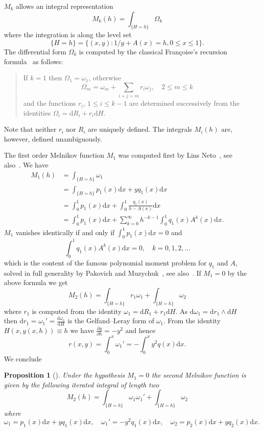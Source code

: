 \documentclass[11pt]{article}
\newtheorem{prop}[theo]{Proposition}
\theoremstyle{definition}
\numberwithin{equation}{section}
\numberwithin{figure}{section}
\numberwithin{table}{section}
\newcommand*{\dd}{\mathrm{d}}
\newcommand*{\dx}{\dd x}
\newcommand*{\dH}{\dd H}
\newcommand*{\dR}{\dd R}
\newcommand*{\dr}{\dd r}
\newcommand*{\domega}{\dd \omega}
\begin{document}
$M_k$ allows an integral representation
\[
M_k(h) = \int_{\{H=h\}} \Omega_k
\]
where the integration is along the level set
\[
\{H=h\} = \{(x,y) : 1/y + A(x)= h, 0\leq x \leq 1 \}.
\]
The differential form $\Omega_k$ is computed by the classical Françoise's recursion formula~\cite{fran96,ilie98a,rous98} as follows:
\begin{quotation}
If $k=1$ then $\Omega_1 = \omega_1$, otherwise
\begin{equation}
\Omega_m = \omega_m + \sum_{i+j=m} r_i \omega_j, \quad 2 \leq m \leq k
\end{equation}
and the functions $r_i$, $1\leq i \leq k-1$ are determined successively from the identities $\Omega_i = \dd R_i + r_i \dH$.
\end{quotation}
Note that neither $r_i$ nor $R_i$ are uniquely defined. The integrals $M_i(h)$ are, however, defined unambiguously.

The first order Melnikov function $M_1$ was computed first by Lins Neto~\cite[Section~3]{lins80}, see also~\cite{bfy00}. We have
\begin{align*}
M_1(h) &= \int_{\{H=h\}} \omega_1 \\ &= \int_{\{H=h\}} p_1(x) \dx + yq_1(x) \dx\\
& = \int_0^1 p_1(x) \dx + \int_0^1 \frac{q_1(x)}{h - A(x)} \dx \\
& = \int_0^1 p_1(x) \dx + \sum_{k=0}^\infty h^{-k-1} \int_0^1 q_1(x) A^k(x)\dx.
\end{align*}
$M_1$ vanishes identically if and only if $\int_0^1 p_1(x) \dx = 0$ and
\[
\int_0^1 q_1(x) A^k(x) \dx = 0, \quad k= 0,1,2, \dots
\]
which is the content of the famous polynomial moment problem for $q_1$ and $A$, solved in full generality by Pakovich and Muzychuk~\cite{pamu09}, see also~\cite{bfy98,bfy99,bfy00,chri00,yomd03}. If $M_1=0$ by the above formula we get
\[
M_2(h)= \int_{\{H=h\}} r_1 \omega_1 + \int_{\{H=h\}} \omega_2
\]
where $r_1$ is computed from the identity $\omega_1= \dR_1 + r_1 \dH$. As $\domega_1 = \dr_1 \wedge \dH$ then $\dr_1 = \omega_1'= \frac{\domega_1}{\dH}$ is the Gelfand--Leray form of $\omega_1$. From the identity $H(x,y(x,h)) \equiv h$ we have $ \frac{\partial y}{\partial h} = - y^2$ and hence
\[
r(x,y)= \int_0^x \omega_1' = - \int_0^x y^2 q(x) \dx.
\]
We conclude


\begin{prop}[{\cite[Formula~(2.8)]{gavr05}}]\label{prop3.1}
Under the hypothesis $M_1=0$ the second Melnikov function is given by the following iterated integral of length two
\begin{equation}
M_2(h) = \int_{\{H=h\}} \omega_1 \omega_1' + \int_{\{H=h\}} \omega_2
\end{equation}
where
\[
\omega_1= p_1(x) \dx + yq_1(x) \dx,\quad \omega_1'= -y^2 q_1(x) \dx,\quad \omega_2= p_2(x) \dx + yq_2(x) \dx.
\]
\end{prop}
\end{document}
